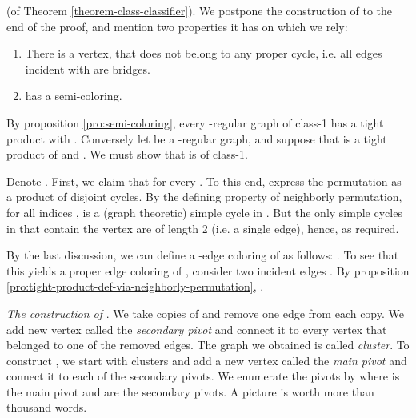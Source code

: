 \documentclass[12pt]{article}
\newtheorem{open question}[theorem]{Open question}
\newcommand{\proof}{{\par\noindent {\bf Proof}\space\space}}
\begin{document}
\proof (of Theorem \ref{theorem-class-classifier}).
We postpone the construction of  to the end of the proof, and mention two properties it has on which we rely:
\begin{enumerate}
\item There is a vertex,  that does not belong
to any proper cycle, i.e. all edges incident with  are bridges.
\item  has a semi-coloring.
\end{enumerate}
By proposition \ref{pro:semi-coloring}, every -regular graph of class-1 has a tight product with . Conversely let  be a -regular graph, and suppose that  is a tight product of  and . We must show that  is of class-1.

Denote .
First, we claim that  for every . To this end,
express the permutation  as a product of disjoint cycles. By the defining property of neighborly permutation, 
for all indices ,  is a
(graph theoretic) simple cycle in . But the only simple cycles in  that contain the vertex  are of length 2 (i.e. a single edge), hence,  as required.

By the last discussion, we can define a -edge coloring  of  as follows: . To see that this yields a proper edge coloring of , consider two incident edges . By proposition \ref{pro:tight-product-def-via-neighborly-permutation}, .

{\em The construction of }. We take  copies of  and remove one edge from each copy. We add new vertex called the {\em secondary pivot} and connect it to every vertex that belonged to one of the removed edges. The graph we obtained is called {\em cluster}. To construct , we start with  clusters and add a new vertex called the {\em main pivot} and connect it to each of the secondary pivots. We enumerate the pivots by  where  is the main pivot and  are the secondary pivots. A picture is worth more than thousand words.
\end{document}
